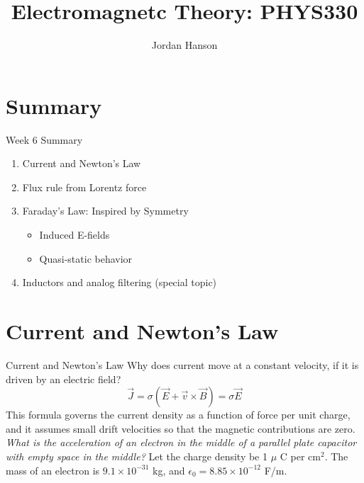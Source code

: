\documentclass{beamer}
\title{Electromagnetc Theory: PHYS330}
\author{Jordan Hanson}
\institute{Whittier College Department of Physics and Astronomy}
\begin{document}
\maketitle

\section{Summary}

\begin{frame}{Week 6 Summary}
\begin{enumerate}
\item Current and Newton's Law
\item Flux rule from Lorentz force
\item Faraday's Law: Inspired by Symmetry
\begin{itemize}
\item Induced E-fields
\item Quasi-static behavior
\end{itemize}
\item Inductors and analog filtering (special topic)
\end{enumerate}
\end{frame}

\section{Current and Newton's Law}

\begin{frame}{Current and Newton's Law}
Why does current move at a constant velocity, if it is driven by an electric field?
\begin{equation}
\vec{J} = \sigma (\vec{E} + \vec{v} \times \vec{B} ) = \sigma \vec{E}
\end{equation}
This formula governs the current density as a function of force per unit charge, and it assumes small drift velocities so that the magnetic contributions are zero. \\ \vspace{0.5cm}
\textit{What is the acceleration of an electron in the middle of a parallel plate capacitor with empty space in the middle? } Let the charge density be 1 $\mu$ C per cm$^2$.  The mass of an electron is $9.1\times 10^{-31}$ kg, and $\epsilon_0 = 8.85 \times 10^{-12}$ F/m.
\end{frame}
\end{document}
